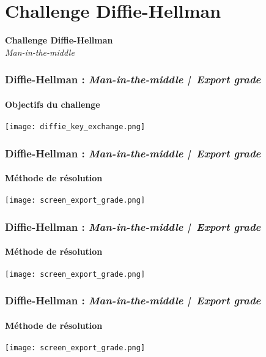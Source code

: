 
\section{Challenge Diffie-Hellman}

\begin{frame}
    \centering
    \Huge{\bfseries Challenge Diffie-Hellman}\\[1.5em]
    \huge{\textit{Man-in-the-middle}}
\end{frame}

\begin{frame}
    \frametitle{Diffie-Hellman : \textit{Man-in-the-middle | Export grade}}
    \framesubtitle{Objectifs du challenge}
    \begin{center}
        \texttt{[image: diffie\_key\_exchange.png]}
        \vspace{0.5em}
    \end{center}
\end{frame}

\begin{frame}
    \frametitle{Diffie-Hellman : \textit{Man-in-the-middle | Export grade}}
    \framesubtitle{Méthode de résolution}
    \begin{center}
        \texttt{[image: screen\_export\_grade.png]}
        \vspace{0.5em}
    \end{center}
\end{frame}

\begin{frame}
    \frametitle{Diffie-Hellman : \textit{Man-in-the-middle | Export grade}}
    \framesubtitle{Méthode de résolution}
    \begin{center}
        \texttt{[image: screen\_export\_grade.png]}
        \vspace{0.5em}
    \end{center}
\end{frame}

\begin{frame}
    \frametitle{Diffie-Hellman : \textit{Man-in-the-middle | Export grade}}
    \framesubtitle{Méthode de résolution}
    \begin{center}
        \texttt{[image: screen\_export\_grade.png]}
        \vspace{0.5em}
    \end{center}
\end{frame}

